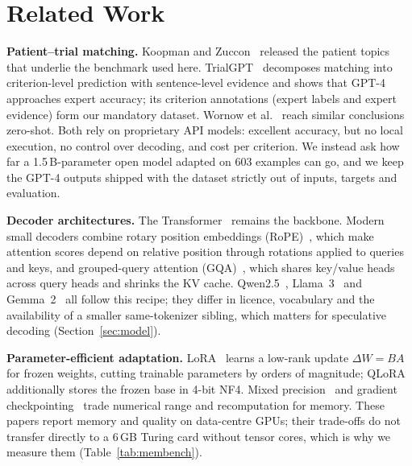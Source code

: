 \section{Related Work}\label{sec:related}
\textbf{Patient--trial matching.} Koopman and Zuccon~\cite{koopman2016test} released the patient topics
that underlie the benchmark used here. TrialGPT~\cite{jin2024trialgpt} decomposes matching into
criterion-level prediction with sentence-level evidence and shows that GPT-4 approaches expert accuracy;
its criterion annotations (expert labels and expert evidence) form our mandatory dataset. Wornow et
al.~\cite{wornow2024zeroshot} reach similar conclusions zero-shot. Both rely on proprietary API models:
excellent accuracy, but no local execution, no control over decoding, and cost per criterion. We instead
ask how far a 1.5\,B-parameter open model adapted on 603 examples can go, and we keep the GPT-4 outputs
shipped with the dataset strictly out of inputs, targets and evaluation.

\textbf{Decoder architectures.} The Transformer~\cite{vaswani2017attention} remains the backbone. Modern
small decoders combine rotary position embeddings (RoPE)~\cite{su2024roformer}, which make attention scores
depend on relative position through rotations applied to queries and keys, and grouped-query attention
(GQA)~\cite{ainslie2023gqa}, which shares key/value heads across query heads and shrinks the KV cache.
Qwen2.5~\cite{qwen2025qwen25}, Llama~3~\cite{grattafiori2024llama3} and Gemma~2~\cite{gemmateam2024gemma2}
all follow this recipe; they differ in licence, vocabulary and the availability of a smaller
same-tokenizer sibling, which matters for speculative decoding (Section~\ref{sec:model}).

\textbf{Parameter-efficient adaptation.} LoRA~\cite{hu2022lora} learns a low-rank update $\Delta W=BA$
for frozen weights, cutting trainable parameters by orders of magnitude; QLoRA~\cite{dettmers2023qlora}
additionally stores the frozen base in 4-bit NF4. Mixed precision~\cite{micikevicius2018mixed} and
gradient checkpointing~\cite{chen2016checkpoint} trade numerical range and recomputation for memory.
These papers report memory and quality on data-centre GPUs; their trade-offs do not transfer directly to
a 6\,GB Turing card without tensor cores, which is why we measure them (Table~\ref{tab:membench}).

